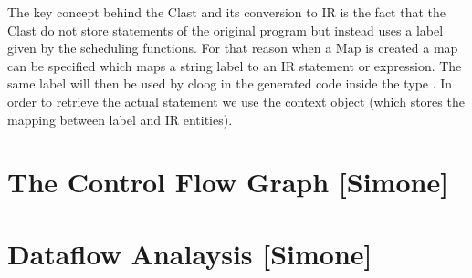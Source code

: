 The key concept behind the Clast and its conversion to IR is the fact that the
Clast do not store statements of the original program but instead uses a label
given by the scheduling functions. For that reason when a Map is created a map
can be specified which maps a string label to an IR statement or expression. The
same label will then be used by cloog in the generated code inside the type
. In order to retrieve the actual statement we use the
context object (which stores the mapping between label and IR entities). 

\section{The Control Flow Graph [Simone]}
\label{insieme:analysis:cfg}



\section{Dataflow Analaysis [Simone]}
\label{insieme:analysis:dtaflow}
